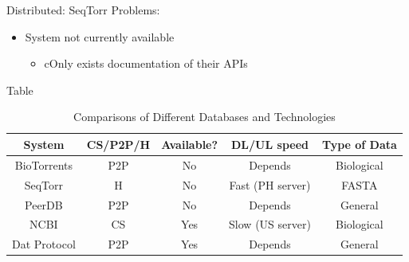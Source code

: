 \documentclass{beamer}
\begin{document}
    
    \begin{frame}{Distributed: SeqTorr}
        Problems: 
        \begin{itemize}
            \item System not currently available
            \begin{itemize}
                \item cOnly exists documentation of their APIs
            \end{itemize}
        \end{itemize}
    \end{frame}
    
    \begin{frame}{Table}

\begin{table}[h]
    \caption{Comparisons of Different Databases and Technologies}
    \label{table:database_comparison_table}
    \begin{tabular}{ccccc}
    \toprule
    System      & CS/P2P/H & Available? & DL/UL speed & Type of Data \\ 
    \midrule
    BioTorrents & P2P           & No         & Depends                    & Biological  \\ 
    SeqTorr     & H             & No         & Fast (PH server)           & FASTA        \\ 
    PeerDB      & P2P           & No         & Depends                    & General      \\ 
    NCBI        & CS            & Yes        & Slow (US server)           & Biological  \\
    Dat Protocol    & P2P      & Yes        & Depends           & General  \\ 
    \bottomrule
    \end{tabular}
\end{table} 
\end{frame}

\end{document}
